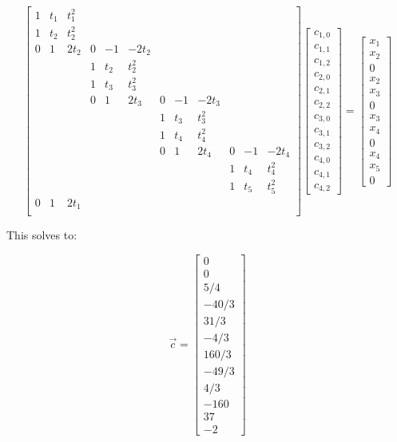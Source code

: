 \documentclass[11pt,letterpaper]{article}
\begin{document}
\[ \left[ \begin{array}{cccccccccccc}
1 & t_1 & t_1^2 \\
1 & t_2 & t_2^2 \\
0 &   1 &  2t_2 & 0 & -1 & -2t_2 \\
  &     &       & 1 & t_2 & t_2^2 \\
  &     &       & 1 & t_3 & t_3^2 \\
  &     &       & 0 &   1 &  2t_3 & 0 & -1 & -2t_3 \\
  &     &       &   &     &       & 1 & t_3 & t_3^2 \\
  &     &       &   &     &       & 1 & t_4 & t_4^2 \\
  &     &       &   &     &       & 0 &   1 &  2t_4 & 0 & -1 & -2t_4 \\
  &     &       &   &     &       &   &     &       & 1 & t_4 & t_4^2 \\
  &     &       &   &     &       &   &     &       & 1 & t_5 & t_5^2 \\
0 &   1 &  2t_1 &   &     &       \\
\end{array} \right]\left[ \begin{array}{c}
c_{1,0}\\
c_{1,1}\\
c_{1,2}\\
c_{2,0}\\
c_{2,1}\\
c_{2,2}\\
c_{3,0}\\
c_{3,1}\\
c_{3,2}\\
c_{4,0}\\
c_{4,1}\\
c_{4,2}
\end{array} \right] = \left[ \begin{array}{c}
x_1\\
x_2\\
0\\
x_2\\
x_3\\
0\\
x_3\\
x_4\\
0\\
x_4\\
x_5\\
0
\end{array} \right]\]

This solves to:

\[ \vec{c} = \left[ \begin{array}{c}
0\\
0\\
5/4 \\
-40/3 \\
31/3 \\
-4/3 \\
160/3 \\
-49/3 \\
4/3 \\
-160 \\
37 \\
-2
\end{array} \right] \]
\end{document}

